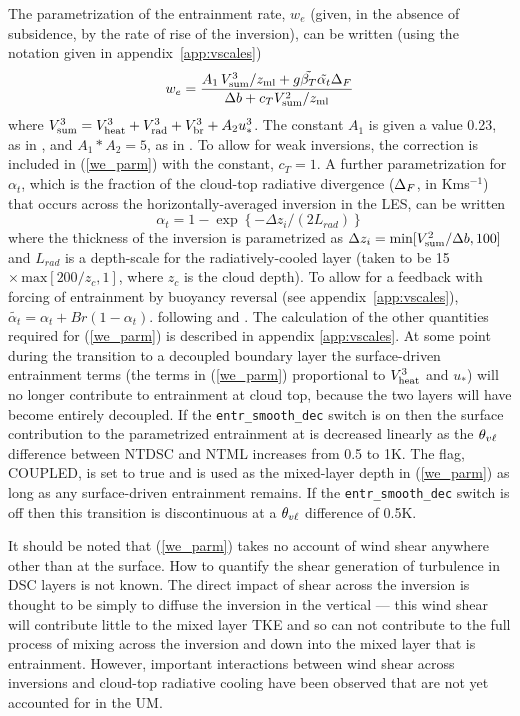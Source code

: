 \documentclass{UMDP_article}
\begin{document}
The parametrization of the entrainment rate, $w_e$ (given, in the
absence of subsidence, by the rate of rise of the inversion), can be
written (using the notation given in appendix~\ref{app:vscales})
\begin{equation}
  w_e =  \frac{ A_1 \, V_{\rm sum}^3 / z_{\rm ml} + g \tilde{\beta_T} \tilde{\alpha_t} 
    \Delta_F }
  {\Delta b + c_T V_{\rm sum}^2/z_{\rm ml} }
  \label{we_parm}
\end{equation}
where $ V_{\rm sum}^3 = V_{\rm heat}^3 + V_{\rm rad}^3 + V_{\rm br}^3 + A_2 u_*^3 $.  The constant
$A_1$ is given a value 0.23, as in \cite{lock98}, and $A_1*A_2=5$, as
in \cite{driedonks1982}.  To allow for weak inversions, the
\cite{zilitinkevich1975} correction is included in (\ref{we_parm})
with the constant, $c_T=1$.  A further parametrization for $\alpha_t$,
which is the fraction of the cloud-top radiative divergence
($\Delta_F $, in Kms$^{-1}$) that occurs across the
horizontally-averaged inversion in the LES, can be written
\begin{equation*}
  \alpha_t = 1 - \exp{ \left\{-\Delta z_i / (2 L_{rad})\right\} }
\end{equation*}
where the thickness of the inversion is parametrized as $\Delta z_i =
\mbox{min}[V_{\rm sum}^2/\Delta b, 100]$ and $L_{rad}$ is a depth-scale for
the radiatively-cooled layer (taken to be 15 $\times
\,\mbox{max}[200/z_c, 1]$, where $z_c$ is the cloud depth).  To allow
for a feedback with forcing of entrainment by buoyancy reversal (see
appendix~\ref{app:vscales}), $\tilde{\alpha_t} = \alpha_t+ Br
(1-\alpha_t) $.  following \cite{lock98} and \cite{lock09:_factor}.
The calculation of the other quantities required for (\ref{we_parm})
is described in appendix \ref{app:vscales}.  At some point during the
transition to a decoupled boundary layer the surface-driven
entrainment terms (the terms in (\ref{we_parm}) proportional to
$V_{\rm heat}^3$ and $u_*$) will no longer contribute to entrainment at cloud
top, because the two layers will have become entirely decoupled.  If
the {\tt entr\_smooth\_dec} switch is on then the surface contribution
to the parametrized entrainment at \zhsc is decreased linearly as the
$\theta_{v\ell}$ difference between NTDSC and NTML increases from 0.5 to 1K.
The flag, COUPLED, is set to true and \zhsc is used as the mixed-layer
depth in (\ref{we_parm}) as long as any surface-driven entrainment
remains.  If the {\tt entr\_smooth\_dec} switch is off then this
transition is discontinuous at a $\theta_{v\ell}$ difference of 0.5K.

It should be noted that (\ref{we_parm}) takes no account of wind shear
anywhere other than at the surface.  How to quantify the shear
generation of turbulence in DSC layers is not known.  The direct
impact of shear across the inversion is thought to be simply to
diffuse the inversion in the vertical --- this wind shear will
contribute little to the mixed layer TKE and so can not contribute to
the full process of mixing across the inversion and down into the
mixed layer that is entrainment.  However, important interactions
between wind shear across inversions and cloud-top radiative cooling
have been observed that are not yet accounted for in the UM.
\end{document}
